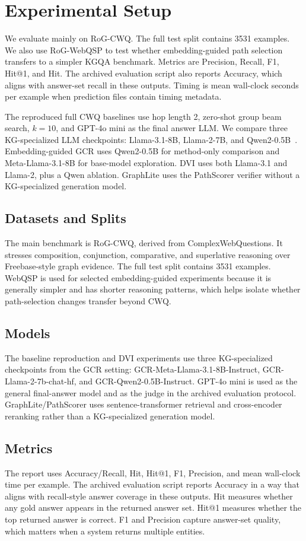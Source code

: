 \documentclass[10pt,twocolumn]{article}
\begin{document}
\section{Experimental Setup}
We evaluate mainly on RoG-CWQ. The full test split contains 3531 examples. We also use RoG-WebQSP to test whether embedding-guided path selection transfers to a simpler KGQA benchmark. Metrics are Precision, Recall, F1, Hit@1, and Hit. The archived evaluation script also reports Accuracy, which aligns with answer-set recall in these outputs. Timing is mean wall-clock seconds per example when prediction files contain timing metadata.

The reproduced full CWQ baselines use hop length 2, zero-shot group beam search, $k=10$, and GPT-4o mini as the final answer LLM. We compare three KG-specialized LLM checkpoints: Llama-3.1-8B, Llama-2-7B, and Qwen2-0.5B~\cite{grattafiori2024llama3,touvron2023llama2,yang2024qwen2}. Embedding-guided GCR uses Qwen2-0.5B for method-only comparison and Meta-Llama-3.1-8B for base-model exploration. DVI uses both Llama-3.1 and Llama-2, plus a Qwen ablation. GraphLite uses the PathScorer verifier without a KG-specialized generation model.


\subsection{Datasets and Splits}
The main benchmark is RoG-CWQ, derived from ComplexWebQuestions. It stresses composition, conjunction, comparative, and superlative reasoning over Freebase-style graph evidence. The full test split contains 3531 examples. WebQSP is used for selected embedding-guided experiments because it is generally simpler and has shorter reasoning patterns, which helps isolate whether path-selection changes transfer beyond CWQ.

\subsection{Models}
The baseline reproduction and DVI experiments use three KG-specialized checkpoints from the GCR setting: GCR-Meta-Llama-3.1-8B-Instruct, GCR-Llama-2-7b-chat-hf, and GCR-Qwen2-0.5B-Instruct. GPT-4o mini is used as the general final-answer model and as the judge in the archived evaluation protocol. GraphLite/PathScorer uses sentence-transformer retrieval and cross-encoder reranking rather than a KG-specialized generation model.

\subsection{Metrics}
The report uses Accuracy/Recall, Hit, Hit@1, F1, Precision, and mean wall-clock time per example. The archived evaluation script reports Accuracy in a way that aligns with recall-style answer coverage in these outputs. Hit measures whether any gold answer appears in the returned answer set. Hit@1 measures whether the top returned answer is correct. F1 and Precision capture answer-set quality, which matters when a system returns multiple entities.
\end{document}
